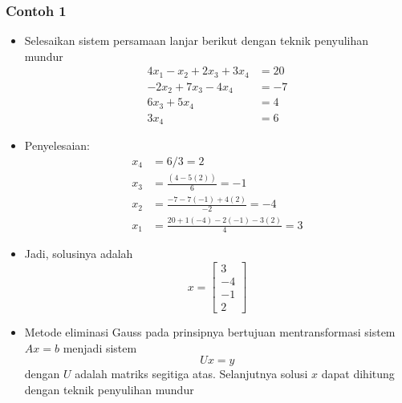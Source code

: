 \documentclass[pdflatex,compress,mathserif]{beamer}
\begin{document}
\begin{frame}
	\frametitle{Contoh 1}
	\begin{itemize}
		\item Selesaikan sistem persamaan lanjar berikut dengan teknik penyulihan mundur
		\begin{align*}
			4x_1 - x_2 + 2x_3 + 3x_4 &= 20 \\
			-2x_2 + 7x_3 - 4x_4 &= -7 \\
			6x_3 + 5x_4 &= 4 \\
			3x_4 &= 6
		\end{align*}
	\end{itemize}
\end{frame}

\begin{frame}
	\begin{itemize}
		\item Penyelesaian:
		\begin{align*}
		x_4 &= 6/3 = 2 \\
		x_3 &= \frac{(4-5(2))}{6} = -1 \\
		x_2 &= \frac{-7-7(-1)+4(2)}{-2} = -4 \\
		x_1 &= \frac{20 + 1(-4) - 2(-1)-3(2)}{4} = 3
		\end{align*}
		\item Jadi, solusinya adalah \[ x = \begin{bmatrix}
			3 \\ -4 \\ -1 \\ 2
		\end{bmatrix} \]
	\end{itemize}
\end{frame}

\begin{frame}
	\begin{itemize}
		\item Metode eliminasi Gauss pada prinsipnya bertujuan mentransformasi sistem $ Ax = b $ menjadi sistem \[ Ux = y \] dengan $ U $ adalah matriks segitiga atas. Selanjutnya solusi $ x $ dapat dihitung dengan teknik penyulihan mundur
	\end{itemize}
\end{frame}
\end{document}
